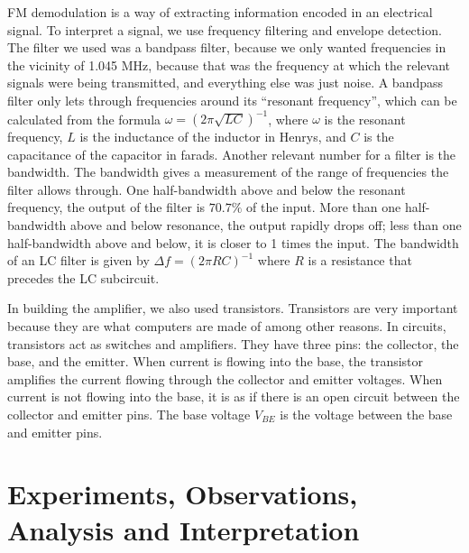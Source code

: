 \documentclass[11pt]{article}
\newcommand{\inv}{^{-1}}
\begin{document}
FM demodulation is a way of extracting information encoded in an electrical signal. To interpret a signal, 
we use frequency filtering and envelope detection. The filter we used was a bandpass filter, because
we only wanted frequencies in the vicinity of 1.045 MHz, because that was the frequency at which the
relevant signals were being transmitted, and everything else was just noise. A bandpass filter only
lets through frequencies around its ``resonant frequency'', which can be calculated from the formula
$\omega = (2\pi\sqrt{LC})\inv$, where $\omega$ is the resonant frequency, $L$ is
the inductance of the inductor in Henrys, and $C$ is the capacitance of
the capacitor in farads. Another relevant number for a filter is the bandwidth. The
bandwidth gives a measurement of the range of frequencies the filter allows through. 
One half-bandwidth above and below the resonant frequency, the output of the filter 
is $70.7\%$ of the input. More than one half-bandwidth above and below resonance, the output
rapidly drops off; less than one half-bandwidth above and below, it is closer to 1 times the input.
The bandwidth of an LC filter is given by $\Delta f = (2\pi RC)\inv$ where $R$ is a resistance
that precedes the LC subcircuit. 

In building the amplifier, we also used transistors. Transistors are very important because they are what
computers are made of among other reasons. In circuits, transistors act as switches and amplifiers. They have
three pins: the collector, the base, and the emitter. When current is flowing into the base, the transistor
amplifies the current flowing through the collector and emitter voltages. When current is not flowing into the base,
it is as if there is an open circuit between the collector and emitter pins. The base voltage $V_{BE}$ is the 
voltage between the base and emitter pins. 

\section{Experiments, Observations, Analysis and Interpretation}
\end{document}
